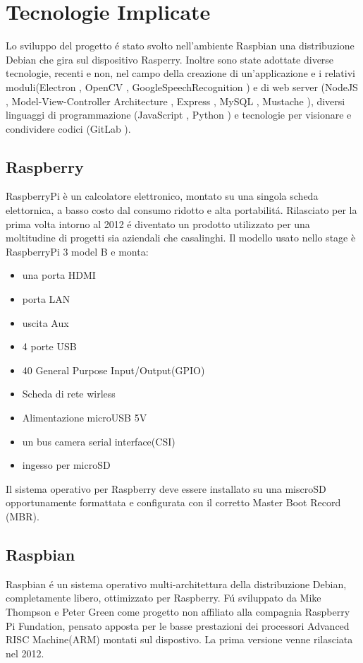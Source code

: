 \chapter{Tecnologie Implicate}

Lo sviluppo del progetto \'e stato svolto nell'ambiente Raspbian\cite{Raspbian}
una distribuzione Debian\cite{Debian} che gira sul dispositivo Rasperry\cite{Raspberry}.
Inoltre sono state adottate diverse tecnologie, recenti
e non, nel campo della creazione di un'applicazione e i relativi moduli(Electron \cite{Electron-website},
OpenCV \cite{OpenCV-website}, GoogleSpeechRecognition \cite{GoogleSTT-website})
e di web server (NodeJS \cite{NodeJS-website},  Model-View-Controller Architecture \cite{MVC-Architecture},
Express \cite{Express-website}, MySQL \cite{MySQL}, Mustache \cite{Mustache}),
diversi linguaggi di programmazione (JavaScript \cite{JavaScript}, Python \cite{Python})
e tecnologie per visionare e condividere codici (GitLab \cite{git-website}).

\section{Raspberry}
RaspberryPi è un calcolatore elettronico, montato su una singola scheda elettornica, a basso costo
dal consumo ridotto e alta portabilit\'a.
Rilasciato per la prima volta intorno al 2012 \'e diventato un prodotto utilizzato per una moltitudine
di progetti sia aziendali che casalinghi.
Il modello usato nello stage è RaspberryPi 3 model B e monta:
\begin{itemize}
\item una porta HDMI
\item porta LAN
\item uscita Aux
\item 4 porte USB
\item 40 General Purpose Input/Output(GPIO)
\item Scheda di rete wirless
\item Alimentazione microUSB 5V
\item un bus camera serial interface(CSI)
\item ingesso per microSD
\end{itemize}
Il sistema operativo per Raspberry deve essere installato su una miscroSD opportunamente formattata
e configurata con il corretto Master Boot Record (MBR).

\section{Raspbian}
Raspbian \'e un sistema operativo multi-architettura della distribuzione Debian, completamente libero,
ottimizzato per Raspberry.
F\'u sviluppato da Mike Thompson e Peter Green come progetto non affiliato alla compagnia Raspberry Pi
Fundation, pensato apposta per le basse prestazioni dei processori Advanced RISC Machine(ARM) montati sul
dispostivo.
La prima versione venne rilasciata nel 2012.


